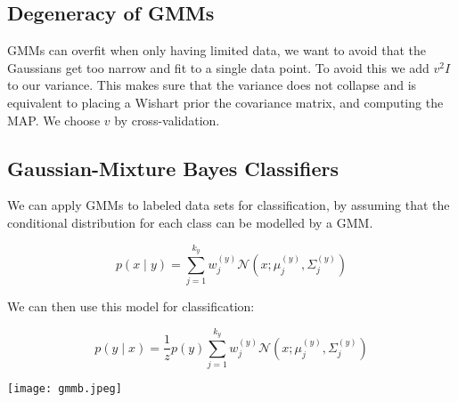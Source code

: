 \subsection{Degeneracy of GMMs}

GMMs can overfit when only having limited data, we want to avoid that the Gaussians get too narrow and fit to a single data point. To avoid this we add $v^2 I$ to our variance. This makes sure that the variance does not collapse and is equivalent to placing a Wishart prior the covariance matrix, and computing the MAP. We choose $v$ by cross-validation.

\subsection{Gaussian-Mixture Bayes Classifiers}

We can apply GMMs to labeled data sets for classification, by assuming that the conditional distribution for each class can be modelled by a GMM.

$$p(x \; | \; y) = \sum_{j=1}^{k_y} w_j^{(y)} \mathcal{N}(x; \mu_j^{(y)}, \Sigma_j^{(y)})$$

We can then use this model for classification:

$$p(y \; | \; x) = \frac{1}{z} p(y)  \sum_{j=1}^{k_y} w_j^{(y)} \mathcal{N}(x; \mu_j^{(y)}, \Sigma_j^{(y)})$$

\begin{center}
	\texttt{[image: gmmb.jpeg]}
\end{center}